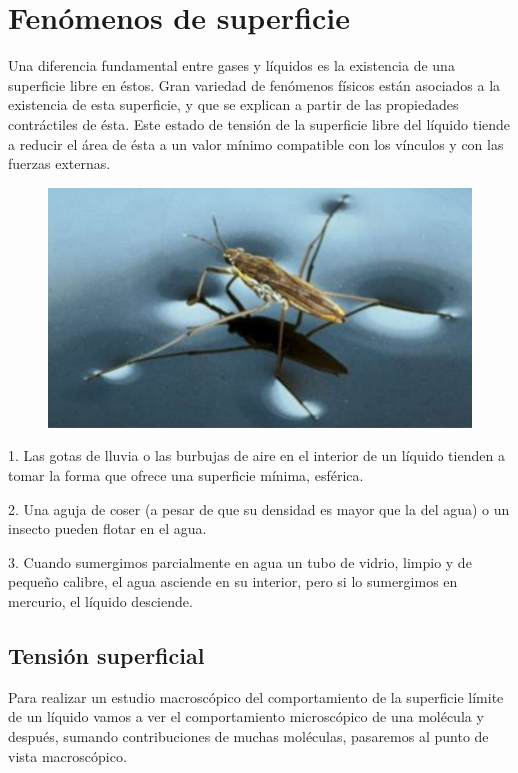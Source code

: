 \chapter{Fenómenos de superficie}	

\begin{miparrafo}
\begin{multicols}{2}
\small{Una diferencia fundamental entre gases y líquidos es la existencia de una superficie libre en éstos.}
\small{Gran variedad de fenómenos físicos están asociados a la existencia de esta superficie, y que se explican a partir de las propiedades contráctiles de ésta.}
\small{Este estado de tensión de la superficie libre del líquido tiende a reducir el área de ésta a un valor mínimo compatible con los vínculos y con las fuerzas externas. }
\begin{figure}[H]
	\centering
	\includegraphics[width=.5\textwidth]{imagenes/imagenes08/T08IM01.png}
\end{figure}
\end{multicols}
 \small{1. Las gotas de lluvia o las burbujas de aire en el interior de un líquido tienden a tomar la forma que ofrece una superficie mínima, esférica. }
 
 \small{2. Una aguja de coser (a pesar de que su densidad es mayor que la del agua) o un insecto pueden flotar en el agua.}
 
 \small{3. Cuando sumergimos parcialmente en agua un tubo de vidrio, limpio y de pequeño calibre, el agua asciende en su interior, pero si lo sumergimos en mercurio, el líquido desciende}\normalsize{.}

\end{miparrafo}
	
\section{Tensión superficial}
	
\normalsize{Para} realizar un estudio macroscópico del comportamiento de la superficie límite de un líquido vamos a ver el comportamiento microscópico de una molécula	 y después, sumando contribuciones de muchas moléculas, pasaremos al punto de vista macroscópico.

